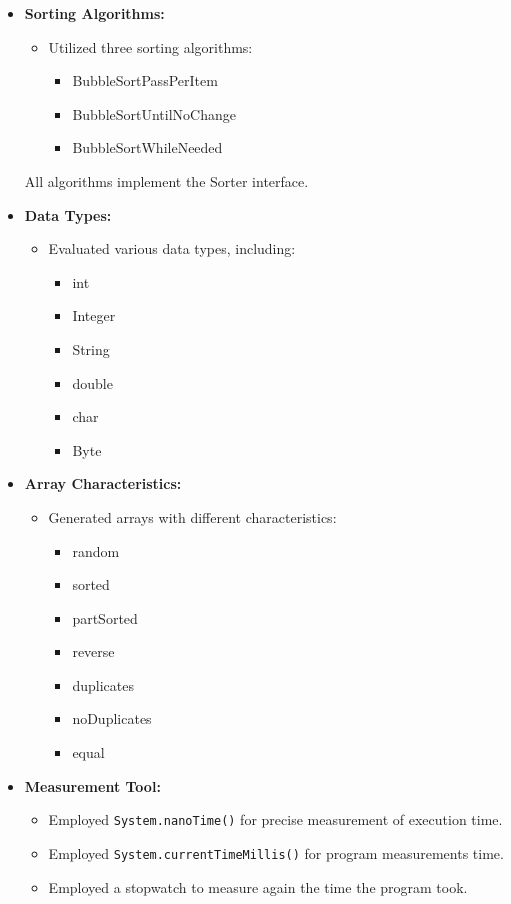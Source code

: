 \documentclass{article}
\begin{document}
\begin{itemize}
  \item \textbf{Sorting Algorithms:}
    \begin{itemize}
      \item Utilized three sorting algorithms:
        \begin{itemize}
          \item BubbleSortPassPerItem
          \item BubbleSortUntilNoChange
          \item BubbleSortWhileNeeded
        \end{itemize}
    \end{itemize}
     All algorithms implement the Sorter interface.

  \item \textbf{Data Types:}
    \begin{itemize}
      \item Evaluated various data types, including:
        \begin{itemize}
          \item int
          \item Integer
          \item String
          \item double
          \item char
          \item Byte
        \end{itemize}
    \end{itemize}

  \item \textbf{Array Characteristics:}
    \begin{itemize}
      \item Generated arrays with different characteristics:
        \begin{itemize}
          \item random
          \item sorted
          \item partSorted
          \item reverse
          \item duplicates
          \item noDuplicates
          \item equal
        \end{itemize}
    \end{itemize}

  \item \textbf{Measurement Tool:}
    \begin{itemize}
      \item Employed \texttt{System.nanoTime()} for precise measurement of execution time.
      \item Employed \texttt{System.currentTimeMillis()} for program measurements time. 
      \item Employed a stopwatch to measure again the time the program took.
    \end{itemize}
    

\end{itemize}
\end{document}
